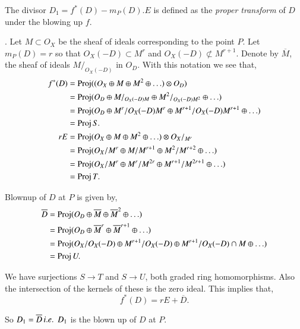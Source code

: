 \begin{def*}
The divisor $D_1=f^*(D)-m_P(D).E$ is defined as the {\it proper
transform} of $D$ under the blowing up $f$.

. Let $M\subset
O_X$ be the sheaf of ideals corresponding to the point $P$. Let
$m_P(D)=r$ so that $O_X(-D)\subset M^r$ and $O_X(-D)\nsubset
M^{r+1}$. Denote by $\overline{M}$, the sheaf of ideals
$M/_{{O_X}(-D)}$ in $O_D$. With this notation we see that,
\begin{align*}
f^*(D) &= \operatorname{Proj} ((O_X\oplus M\oplus M^2\oplus\ldots)\otimes O_D)\\
&= \operatorname{Proj} (O_D\oplus M/_{{O_X}(-D)M}\oplus M^2/_{{O_X}(-D)M^2}\oplus
\ldots)\\ 
&= \operatorname{Proj} (O_D\oplus M^r/{{O_X}(-D)M^r}\oplus M^{r+1}/O_X(-D)M^{r+1}
\oplus \ldots)\\
&= \operatorname{Proj} S.\\
rE &= \operatorname{Proj} (O_X\oplus M\oplus M^2\oplus\ldots)\otimes O_X/_{M^r}\\
&= \operatorname{Proj} (O_X/{M^r}\oplus M/{M^{r+1}}\oplus
M^2/{M^{r+2}}\oplus\ldots)\\
&= \operatorname{Proj} (O_X/{M^r}\oplus M^r/{M^{2r}}\oplus M^{r+1}/{M^{2r+1}}
\oplus\ldots)\\
&= \operatorname{Proj} T.
\end{align*}

Blown\pageoriginale up of $D$ at $P$ is given by,
\begin{align*}
\overline{D} &= \operatorname{Proj} (O_D\oplus\overline{M}\oplus\overline{M}^2
\oplus\ldots)\\
&= \operatorname{Proj} (O_D\oplus\overline{M}^r\oplus\overline{M}^{r+1}\oplus
\ldots)\\
&= \operatorname{Proj} (O_X/{{O_X}(-D)}\oplus M^{r+1}/O_X(-D)\oplus M^{r+1}/O_X
(-D)\cap M\oplus\ldots)\\
&= \operatorname{Proj} U.
\end{align*}

We have surjections $S\longrightarrow T$ and $S\longrightarrow U$,
both graded ring homomorphisms. Also the intersection of the kernels
of these is the zero ideal. This implies that,
$$
f^*(D)=rE+\overline{D}.
$$

So $D_1=\overline{D}\,{i.e.}\kern.3em \, D_1$ is the blown up of $D$ at $P$.
\end{def*}

